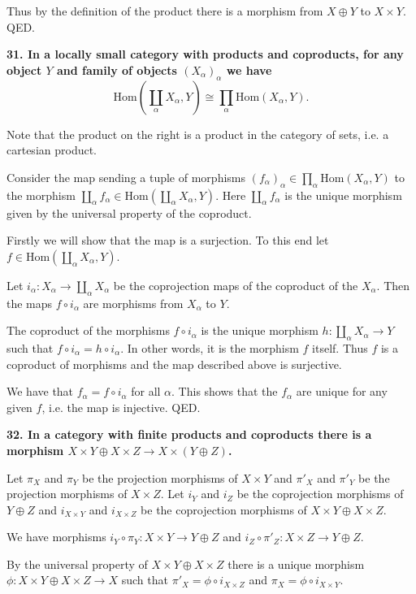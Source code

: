 \documentclass[12pt]{article}
\begin{document}
Thus by the definition of the product there is a morphism from $X\oplus Y$ to $X\times Y$. QED.

\textbf{31. In a locally small category with products and coproducts, for any object $Y$ and family of objects $(X_\alpha)_\alpha$ we have 
$$\mbox{Hom}\left(\coprod_\alpha X_\alpha, Y\right) \cong \prod_\alpha \mbox{Hom}(X_\alpha, Y).$$}

Note that the product on the right is a product in the category of sets, i.e. a cartesian product.

Consider the map sending a tuple of morphisms $(f_\alpha)_\alpha \in \prod_\alpha \mbox{Hom}(X_\alpha, Y)$ to the morphism $\coprod_\alpha f_\alpha \in \mbox{Hom}\left(\coprod_\alpha X_\alpha, Y\right)$. Here $\coprod_\alpha f_\alpha$ is the unique morphism given by the universal property of the coproduct.

Firstly we will show that the map is a surjection. To this end let $f \in \mbox{Hom}\left(\coprod_\alpha X_\alpha, Y\right)$.

Let $i_\alpha : X_\alpha \to \coprod_\alpha X_\alpha$ be the coprojection maps of the coproduct of the $X_\alpha$. Then the maps $f\circ i_\alpha$ are morphisms from $X_\alpha$ to $Y$.

The coproduct of the morphisms $f\circ i_\alpha$ is the unique morphism $h : \coprod_\alpha X_\alpha \to Y$ such that $f\circ i_\alpha = h\circ i_\alpha$. In other words, it is the morphism $f$ itself. Thus $f$ is a coproduct of morphisms and the map described above is surjective.

We have that $f_\alpha = f\circ i_\alpha$ for all $\alpha$. This shows that the $f_\alpha$ are unique for any given $f$, i.e. the map is injective. QED.

\textbf{32. In a category with finite products and coproducts there is a morphism $X\times Y \oplus X\times Z \to X\times(Y\oplus Z)$.}

Let $\pi_X$ and $\pi_Y$ be the projection morphisms of $X\times Y$ and $\pi'_X$ and $\pi'_Y$ be the projection morphisms of $X\times Z$. Let $i_Y$ and $i_Z$ be the coprojection morphisms of $Y\oplus Z$ and $i_{X\times Y}$ and $i_{X\times Z}$ be the coprojection morphisms of $X\times Y\oplus X\times Z$.

We have morphisms $i_Y\circ \pi_Y : X\times Y \to Y\oplus Z$ and $i_Z\circ \pi'_Z : X\times Z \to Y\oplus Z$.

By the universal property of $X\times Y\oplus X\times Z$ there is a unique morphism $\phi : X\times Y\oplus X\times Z \to X$ such that $\pi'_X = \phi\circ i_{X\times Z}$ and $\pi_X = \phi\circ i_{X\times Y}$.
\end{document}
